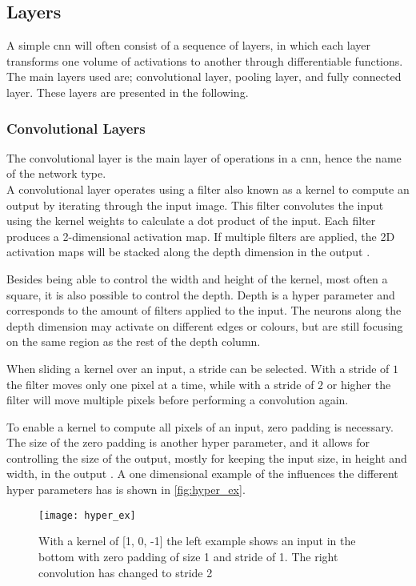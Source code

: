 \subsection{Layers}
A simple \gls{cnn} will often consist of a sequence of layers, in which each layer transforms one volume of activations to another through differentiable functions. The main layers used are; convolutional layer, pooling layer, and fully connected layer. These layers are presented in the following.

\subsubsection{Convolutional Layers}
The convolutional layer is the main layer of operations in a \gls{cnn}, hence the name of the network type.\\

A convolutional layer operates using a filter also known as a kernel to compute an output by iterating through the input image. This filter convolutes the input using the kernel weights to calculate a dot product of the input. Each filter produces a 2-dimensional activation map. If multiple filters are applied, the 2D activation maps will be stacked along the depth dimension in the output .

Besides being able to control the width and height of the kernel, most often a square, it is also possible to control the depth. Depth is a hyper parameter and corresponds to the amount of filters applied to the input. The neurons along the depth dimension may activate on different edges or colours, but are still focusing on the same region as the rest of the depth column.

When sliding a kernel over an input, a stride can be selected. With a stride of $1$ the filter moves only one pixel at a time, while with a stride of $2$ or higher the filter will move multiple pixels before performing a convolution again.

To enable a kernel to compute all pixels of an input, zero padding is necessary. The size of the zero padding is another hyper parameter, and it allows for controlling the size of the output, mostly for keeping the input size, in height and width, in the output \citep{Karpathy2016b}. A one dimensional example of the influences the different hyper parameters has is shown in \autoref{fig:hyper_ex}.

\begin{figure}[H]
	\centering
	\texttt{[image: hyper\_ex]}
	\caption{With a kernel of [1, 0, -1] the left example shows an input in the bottom with zero padding of size 1 and stride of 1. The right convolution has changed to stride 2 \citep{Karpathy2016b}}
	\label{fig:hyper_ex}
\end{figure}

